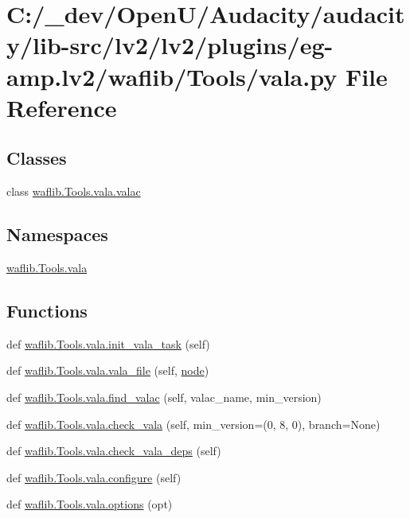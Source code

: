 \hypertarget{lv2_2plugins_2eg-amp_8lv2_2waflib_2_tools_2vala_8py}{}\section{C\+:/\+\_\+dev/\+Open\+U/\+Audacity/audacity/lib-\/src/lv2/lv2/plugins/eg-\/amp.lv2/waflib/\+Tools/vala.py File Reference}
\label{lv2_2plugins_2eg-amp_8lv2_2waflib_2_tools_2vala_8py}
\subsection*{Classes}
\begin{DoxyCompactItemize}
\item 
class \hyperlink{classwaflib_1_1_tools_1_1vala_1_1valac}{waflib.\+Tools.\+vala.\+valac}
\end{DoxyCompactItemize}
\subsection*{Namespaces}
\begin{DoxyCompactItemize}
\item 
 \hyperlink{namespacewaflib_1_1_tools_1_1vala}{waflib.\+Tools.\+vala}
\end{DoxyCompactItemize}
\subsection*{Functions}
\begin{DoxyCompactItemize}
\item 
def \hyperlink{namespacewaflib_1_1_tools_1_1vala_afedcf657dff8a988abdf3f52dc1b1584}{waflib.\+Tools.\+vala.\+init\+\_\+vala\+\_\+task} (self)
\item 
def \hyperlink{namespacewaflib_1_1_tools_1_1vala_a6baf611b698503ed4c43e8ff2e870acd}{waflib.\+Tools.\+vala.\+vala\+\_\+file} (self, \hyperlink{structnode}{node})
\item 
def \hyperlink{namespacewaflib_1_1_tools_1_1vala_afcb54ec67c0f38a26b8cf34ae9c89b7b}{waflib.\+Tools.\+vala.\+find\+\_\+valac} (self, valac\+\_\+name, min\+\_\+version)
\item 
def \hyperlink{namespacewaflib_1_1_tools_1_1vala_a3093897181665808445ee213a19a6d64}{waflib.\+Tools.\+vala.\+check\+\_\+vala} (self, min\+\_\+version=(0, 8, 0), branch=None)
\item 
def \hyperlink{namespacewaflib_1_1_tools_1_1vala_a0e50168b039627d93b07929537af57af}{waflib.\+Tools.\+vala.\+check\+\_\+vala\+\_\+deps} (self)
\item 
def \hyperlink{namespacewaflib_1_1_tools_1_1vala_aa13ac0bb84782b53e5cf4761adb55657}{waflib.\+Tools.\+vala.\+configure} (self)
\item 
def \hyperlink{namespacewaflib_1_1_tools_1_1vala_a17771e1da92206049384a4fea5523b78}{waflib.\+Tools.\+vala.\+options} (opt)
\end{DoxyCompactItemize}
